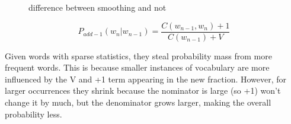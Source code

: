 \documentclass[11pt]{article}
\begin{document}
\begin{figure}[H]
    \centering
    \caption{difference between smoothing and not}\label{fig:smoothing-example}
\end{figure}

\begin{equation*}
    P_{add-1}(w_n|w_{n-1})=\frac{C(w_{n-1},w_n)+1}{C(w_{n-1})+V}
\end{equation*}

Given words with sparse statistics, they steal probability mass from more frequent words. This is because smaller instances of vocabulary are more influenced by the V and +1 term appearing in the new fraction. However, for larger occurrences they shrink because the nominator is large (so +1) won't change it by much, but the denominator grows larger, making the overall probability less.
\end{document}
